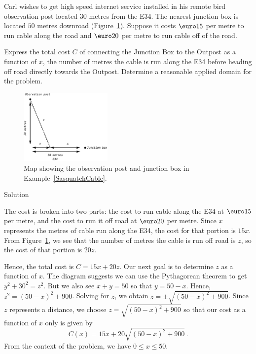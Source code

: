 \begin{example}
 \label{SasquatchCable} Carl wishes to get high speed internet service installed in his remote bird observation post located $30$ metres from the E34. The nearest junction box is located $50$ metres downroad  (Figure~\ref{fig_algebraic_18}).  Suppose it costs $\text{\euro} 15$ per metre to run cable along the road and $\text{\euro} 20$ per metre to run cable off of the road.

Express the total cost $C$ of connecting the Junction Box to the Outpost as a function of $x$, the number of metres the cable is run along the E34 before heading off road directly towards the Outpost.  Determine a reasonable applied domain for the problem.

\begin{figure}[H]
    \begin{center}
			\includegraphics[width=0.4\textwidth]{fig_algebraic_18}
	\end{center}
    \caption{Map showing the observation post and junction box in Example~\ref{SasquatchCable}.}
    \label{fig_algebraic_18}
\end{figure}

\ifcalculus\pagebreak\fi
{}Solution 

 The cost is broken into two parts:  the cost to run cable along the E34 at $\text{\euro} 15$ per metre, and the cost to run it off road at $\text{\euro} 20$ per metre.  Since $x$ represents the metres of cable run along the E34, the cost  for that portion is $15x$.  From Figure~\ref{fig_algebraic_18}, we see that the number of metres the cable is run off road is $z$, so the cost of that portion is $20z$.

 Hence, the total cost is $C = 15x + 20z$.  Our next goal is to determine $z$ as a function of $x$.  The diagram suggests we can use the Pythagorean theorem to get $y^2+30^2 = z^2$.  But we also see $x+y = 50$ so that $y=50-x$.  Hence, $z^2 = (50-x)^2+900$.  Solving for $z$, we obtain $z = \pm \sqrt{(50-x)^2+900}$.  Since $z$ represents a distance, we choose $z = \sqrt{(50-x)^2+900}$ so that our cost as a function of $x$ only is given by \[C(x) = 15x + 20\sqrt{(50-x)^2+900}\,.\] From the context of the problem, we have $0 \leq x \leq 50$.

\end{example}

